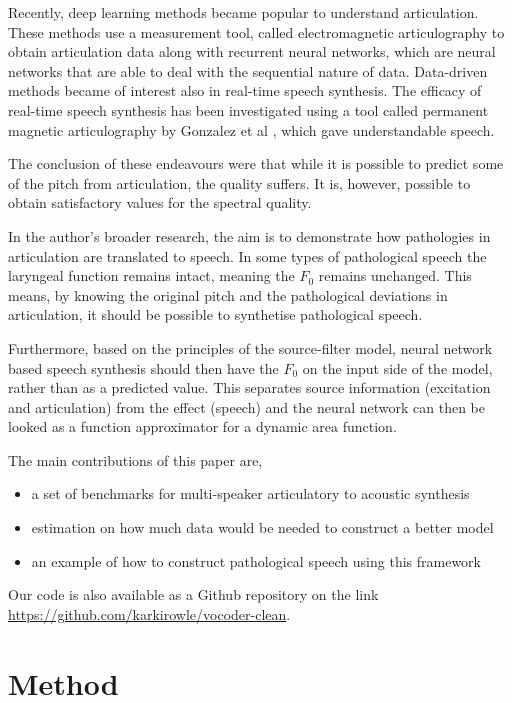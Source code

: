 \documentclass[a4paper]{article}
\begin{document}
Recently, deep learning methods became popular
to understand articulation. These methods use a measurement tool,
called electromagnetic articulography to obtain articulation data 
\cite{Aryal2016} \cite{Taguchi} \cite{Liu2018} along with recurrent
neural networks, which are neural networks that are able to deal with
the sequential nature of data. Data-driven methods became of interest also
in real-time speech synthesis. The efficacy of real-time speech synthesis
has been investigated using a tool called permanent magnetic articulography
by Gonzalez et al \cite{Gonzalez2017}, which gave understandable
speech.

The conclusion of these endeavours were that while it is possible to
predict some of the pitch from articulation, the quality suffers.
It is, however, possible to obtain satisfactory values for the
spectral quality.

In the author's broader research, the aim is to demonstrate how pathologies in
articulation are translated to speech. In some types of pathological
speech the laryngeal function remains intact, meaning the \( F_0 \)
remains unchanged. This means, by knowing the original pitch and the
pathological deviations in articulation, it should be possible to
synthetise pathological speech.

Furthermore, based on the principles of the source-filter model, neural
network based speech synthesis should then have the \( F_0 \) on the
input side of the model, rather than as a predicted value. This separates
source information (excitation and articulation) from the effect (speech)
and the neural network can then be looked as a function approximator
for a dynamic area function.



The main contributions of this paper are,
\begin{itemize}
\item a set of benchmarks for multi-speaker articulatory to acoustic synthesis
\item estimation on how much data would be needed to construct a better model
\item an example of how to construct pathological speech using this framework
\end{itemize}

Our code is also available as a Github repository on the link
\url{https://github.com/karkirowle/vocoder-clean}.

\section{Method}
\end{document}
